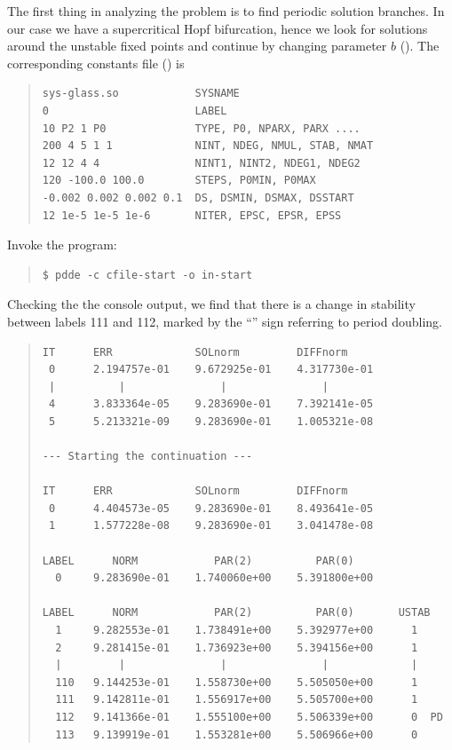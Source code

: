 \documentclass[10pt,a4paper]{ddedoc}
\begin{document}
The first thing in analyzing the problem is to find periodic solution
branches. In our case we have a supercritical Hopf bifurcation, hence we look
for solutions around the unstable fixed points and continue by changing
parameter $b$ (). The corresponding constants file () is
{ \small \begin{quote} \begin{lstlisting}[basicstyle=\tt,frame=single]
sys-glass.so            SYSNAME
0                       LABEL
10 P2 1 P0              TYPE, P0, NPARX, PARX ....
200 4 5 1 1             NINT, NDEG, NMUL, STAB, NMAT
12 12 4 4               NINT1, NINT2, NDEG1, NDEG2
120 -100.0 100.0        STEPS, P0MIN, P0MAX
-0.002 0.002 0.002 0.1  DS, DSMIN, DSMAX, DSSTART
12 1e-5 1e-5 1e-6       NITER, EPSC, EPSR, EPSS
\end{lstlisting} \end{quote} } \noindent
Invoke the program:
{ \small \begin{quote} \begin{lstlisting}[basicstyle=\tt,frame=single]
$ pdde -c cfile-start -o in-start
\end{lstlisting} \end{quote} } \noindent
Checking the the console output, we find that there is a change in
stability between labels 111 and 112, marked by the ``'' sign referring to period doubling.
{ \small \begin{quote} \begin{lstlisting}[basicstyle=\tt,frame=single]
IT      ERR             SOLnorm         DIFFnorm
 0      2.194757e-01    9.672925e-01    4.317730e-01
 |          |               |               |
 4      3.833364e-05    9.283690e-01    7.392141e-05
 5      5.213321e-09    9.283690e-01    1.005321e-08

--- Starting the continuation ---

IT      ERR             SOLnorm         DIFFnorm
 0      4.404573e-05    9.283690e-01    8.493641e-05
 1      1.577228e-08    9.283690e-01    3.041478e-08

LABEL      NORM            PAR(2)          PAR(0)
  0     9.283690e-01    1.740060e+00    5.391800e+00

LABEL      NORM            PAR(2)          PAR(0)       USTAB
  1     9.282553e-01    1.738491e+00    5.392977e+00      1
  2     9.281415e-01    1.736923e+00    5.394156e+00      1
  |         |               |               |             |
  110   9.144253e-01    1.558730e+00    5.505050e+00      1
  111   9.142811e-01    1.556917e+00    5.505700e+00      1
  112   9.141366e-01    1.555100e+00    5.506339e+00      0  PD
  113   9.139919e-01    1.553281e+00    5.506966e+00      0
\end{lstlisting} \end{quote} } \noindent
\end{document}
